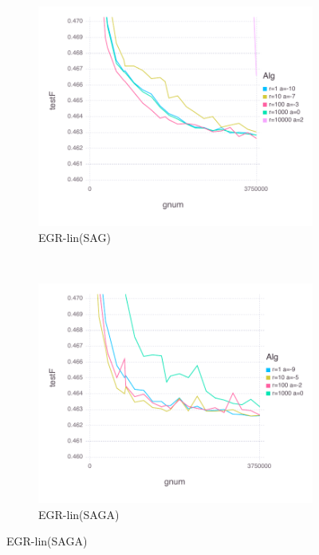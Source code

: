 \documentclass[11pt]{article}
\begin{document}
      \begin{figure}[H]
          \centering
   \begin{subfigure}[b]{0.45\textwidth}
              \includegraphics[width=\textwidth]{Figures/SUSYBLtrueffFinal-linfalse.pdf}
              \caption{EGR-lin(SAG)}
          \end{subfigure}
          ~ %
          \begin{subfigure}[b]{0.45\textwidth}
              \includegraphics[width=\textwidth]{Figures/SUSYBLtrueffFinal-lintrue.pdf}
              \caption{EGR-lin(SAGA)} 
          \end{subfigure}
	   

\end{figure}
\end{document}
